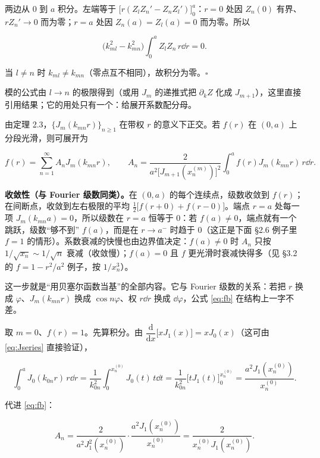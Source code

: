 \documentclass[11pt]{ctexart}
\let\origsubhdr\subhdr
\renewcommand{\subhdr}[1]{\par\needspace{3\baselineskip}\origsubhdr{#1}}
\begin{document}
两边从 $0$ 到 $a$ 积分。左端等于 $\big[r(Z_lZ_n'-Z_nZ_l')\big]_0^a$：$r=0$ 处因 $Z_n(0)$ 有界、$rZ_n'\to0$ 而为零；$r=a$ 处因 $Z_n(a)=Z_l(a)=0$ 而为零。所以

\[
\big(k_{ml}^2-k_{mn}^2\big)\int_0^aZ_lZ_n\,r\dd r=0 .
\]

当 $l\ne n$ 时 $k_{ml}\ne k_{mn}$（零点互不相同），故积分为零。$\square$

模的公式由 $l\to n$ 的极限得到（或用 $J_m$ 的递推式把 $\partial_kZ$ 化成 $J_{m+1}$），这里直接引用结果；它的用处只有一个：给展开系数配分母。


由定理 2.3，$\{J_m(k_{mn}r)\}_{n\ge1}$ 在带权 $r$ 的意义下正交。若 $f(r)$ 在 $(0,a)$ 上分段光滑，则可展开为

\begin{equation}
f(r)=\sum_{n=1}^{\infty}A_nJ_m(k_{mn}r),\qquad
A_n=\frac{2}{a^2\big[J_{m+1}(x_n^{(m)})\big]^2}\int_0^af(r)J_m(k_{mn}r)\,r\dd r .
\label{eq:fb}
\end{equation}

\textbf{收敛性（与 Fourier 级数同类）。}在 $(0,a)$ 的每个连续点，级数收敛到 $f(r)$；在间断点，收敛到左右极限的平均 $\tfrac12\big[f(r+0)+f(r-0)\big]$。端点 $r=a$ 处每一项 $J_m(k_{mn}a)=0$，所以级数在 $r=a$ 恒等于 $0$：若 $f(a)\ne0$，端点就有一个跳跃，级数“够不到” $f(a)$，而是在 $r\to a^-$ 时趋于 $0$（这正是下面 \S2.6 例子里 $f=1$ 的情形）。系数衰减的快慢也由边界值决定：$f(a)\ne0$ 时 $A_n$ 只按 $1/\sqrt{x_n}\sim1/\sqrt n$ 衰减（收敛慢）；$f(a)=0$ 且 $f$ 更光滑时衰减快得多（见 \S3.2 的 $f=1-r^2/a^2$ 例子，按 $1/x_n^3$）。

这一步就是“用贝塞尔函数当基”的全部内容。它与 Fourier 级数的关系：若把 $r$ 换成 $\varphi$、$J_m(k_{mn}r)$ 换成 $\cos n\varphi$、权 $r\dd r$ 换成 $\dd\varphi$，公式 \eqref{eq:fb} 在结构上一字不差。


取 $m=0$、$f(r)=1$。先算积分。由 $\dfrac{\mathrm d}{\mathrm dx}\big[xJ_1(x)\big]=xJ_0(x)$（这可由 \eqref{eq:Jseries} 直接验证），

\[
\int_0^aJ_0(k_{0n}r)\,r\dd r
=\frac1{k_{0n}^2}\int_0^{x_n^{(0)}}J_0(t)\,t\dd t
=\frac1{k_{0n}^2}\Big[tJ_1(t)\Big]_0^{x_n^{(0)}}
=\frac{a^2J_1(x_n^{(0)})}{x_n^{(0)}} .
\]

代进 \eqref{eq:fb}：

\[
A_n=\frac{2}{a^2J_1^2(x_n^{(0)})}\cdot\frac{a^2J_1(x_n^{(0)})}{x_n^{(0)}}=\frac{2}{x_n^{(0)}J_1(x_n^{(0)})}.
\]
\end{document}
